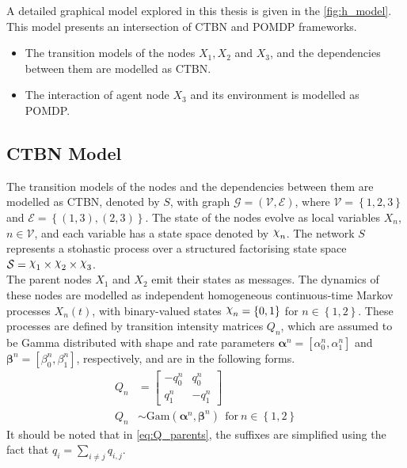 A detailed graphical model explored in this thesis is given in the \cref{fig:h_model}. This model presents an intersection of CTBN and POMDP frameworks. 
\begin{itemize}
	\item The transition models of the nodes $ X_1, X_2$ and $ X_3 $, and the dependencies between them are modelled as CTBN.
	\item The interaction of agent node $ X_3 $ and its environment is modelled as POMDP.
\end{itemize}

\subsection{CTBN Model}
\label{sec:exp_ctbn_model}
The transition models of the nodes and the dependencies between them are modelled as CTBN, denoted by $ S $, with graph $ \mathcal{G} = \left( \mathcal{V}, \mathcal{E}\right) $, where $ \mathcal{V} = \left\lbrace 1, 2, 3 \right\rbrace $ and $ \mathcal{E} = \left\lbrace (1, 3), (2, 3)\right\rbrace  $. The state of the nodes evolve as local variables $ X_n $, $ n\in \mathcal{V} $, and each variable has a state space denoted by $ \rchi_n $. The network $ S $ represents a stohastic process over a structured factorising state space $ \mathcal{S} = \rchi_1 \times \rchi_2 \times \rchi_3 $.\\
The parent nodes $X_{1}$ and $ X_{2} $ emit their states as messages. The dynamics  of these nodes are modelled as independent homogeneous continuous-time Markov processes $X_{n}(t)$, with binary-valued states $ \rchi_{n} = \left\lbrace 0, 1 \right\rbrace  $ for $ n \in \left\lbrace 1,2 \right\rbrace $. These processes are defined by transition intensity matrices $ Q_{n} $, which are assumed to be Gamma distributed with shape and rate parameters $ \symbf{\alpha}^n = [\alpha^n_0, \alpha^n_1] $ and $ \symbf{\beta}^n = [\beta^n_0, \beta^n_1] $, respectively, and are in the following forms.
\begin{align}
Q_n &= 
\begin{bmatrix}
-q^n_{0} & q^n_{0} \\
q^n_{1} &  -q^n_{1}
\end{bmatrix}
\label{eq:Q_parents}\\
Q_{n} &\sim \mathrm{Gam}(\symbf{\alpha}^n, \symbf{\beta}^n)\ \ \text{for}\ n \in \left\lbrace 1,2\right\rbrace \label{eq:gamma_priors}
\end{align}
It should be noted that in \autoref{eq:Q_parents}, the suffixes are simplified using the fact that $ q_{i} = \sum_{i \neq j} q_{i,j}$.\\

